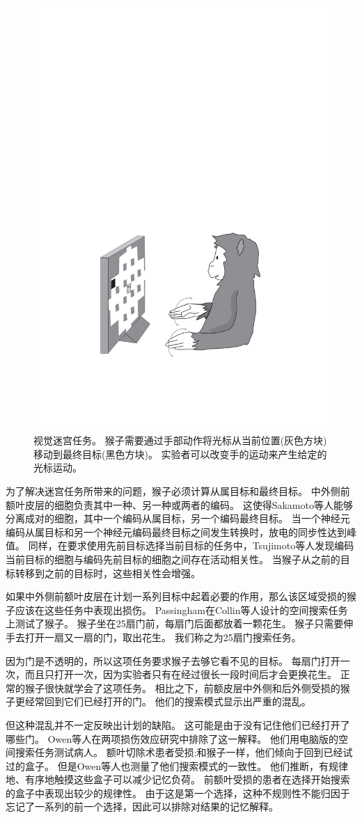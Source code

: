 \begin{figure}
	\centering
	\includegraphics[width=0.4\linewidth]{chap6/6_13}
	\caption{视觉迷宫任务。
		猴子需要通过手部动作将光标从当前位置(灰色方块)移动到最终目标(黑色方块)。
		实验者可以改变手的运动来产生给定的光标运动\cite{gaffan1996associative}。}
	\label{fig:6_13}
\end{figure}


为了解决迷宫任务所带来的问题，猴子必须计算从属目标和最终目标。
中外侧前额叶皮层的细胞负责其中一种、另一种或两者的编码\cite{saito2005representation}。
这使得Sakamoto等人\cite{sakamoto2008discharge}能够分离成对的细胞，其中一个编码从属目标，另一个编码最终目标。
当一个神经元编码从属目标和另一个神经元编码最终目标之间发生转换时，放电的同步性达到峰值。
同样，在要求使用先前目标选择当前目标的任务中，Tsujimoto等人\cite{tsujimoto2008transient}发现编码当前目标的细胞与编码先前目标的细胞之间存在活动相关性。
当猴子从之前的目标转移到之前的目标时，这些相关性会增强。


如果中外侧前额叶皮层在计划一系列目标中起着必要的作用，那么该区域受损的猴子应该在这些任务中表现出损伤。
Passingham\cite{passingham1985memory}在Collin等人\cite{collin1982role}设计的空间搜索任务上测试了猴子。
猴子坐在25扇门前，每扇门后面都放着一颗花生。
猴子只需要伸手去打开一扇又一扇的门，取出花生。
我们称之为25扇门搜索任务。


因为门是不透明的，所以这项任务要求猴子去够它看不见的目标。
每扇门打开一次，而且只打开一次，因为实验者只有在经过很长一段时间后才会更换花生。
正常的猴子很快就学会了这项任务。
相比之下，前额皮层中外侧和后外侧受损的猴子更经常回到它们已经打开的门。
他们的搜索模式显示出严重的混乱。


但这种混乱并不一定反映出计划的缺陷。
这可能是由于没有记住他们已经打开了哪些门。
Owen等人在两项损伤效应研究中排除了这一解释。
他们用电脑版的空间搜索任务测试病人。
额叶切除术患者受损;和猴子一样，他们倾向于回到已经试过的盒子。
但是Owen等人也测量了他们搜索模式的一致性。
他们推断，有规律地、有序地触摸这些盒子可以减少记忆负荷。
前额叶受损的患者在选择开始搜索的盒子中表现出较少的规律性。
由于这是第一个选择，这种不规则性不能归因于忘记了一系列的前一个选择，因此可以排除对结果的记忆解释。


